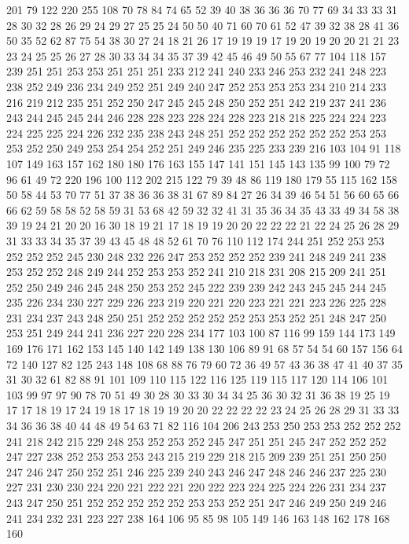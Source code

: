 201 79 122 220 255 108 70 78 84 74 65 52 39 40 38 36 36 36 70 77
69 34 33 33 31 28 30 32 28 26 29 24 29 27 25 25 24 50 50 40
71 60 70 61 52 47 39 32 38 28 41 36 50 35 52 62 87 75 54 38
30 27 24 18 21 26 17 19 19 19 17 19 20 19 20 20 21 21 23 23
24 25 25 26 27 28 30 33 34 34 35 37 39 42 45 46 49 50 55 67
77 104 118 157 239 251 251 253 253 251 251 251 233 212 241 240 233 246 253 232
241 248 223 238 252 249 236 234 249 252 251 249 240 247 252 253 253 253 234 210
214 233 216 219 212 235 251 252 250 247 245 245 248 250 252 251 242 219 237 241
236 243 244 245 245 244 246 228 228 223 228 224 228 223 218 218 225 224 224 223
224 225 225 224 226 232 235 238 243 248 251 252 252 252 252 252 252 253 253 253
252 250 249 253 254 254 252 251 249 246 235 225 233 239 216 103 104 91 118 107
149 163 157 162 180 180 176 163 155 147 141 151 145 143 135 99 100 79 72 96
61 49 72 220 196 100 112 202 215 122 79 39 48 86 119 180 179 55 115 162
158 50 58 44 53 70 77 51 37 38 36 36 38 31 67 89 84 27 26 34
39 46 54 51 56 60 65 66 66 62 59 58 58 52 58 59 31 53 68 42
59 32 32 41 31 35 36 34 35 43 33 49 34 58 38 39 19 24 21 20
20 16 30 18 19 21 17 18 19 19 20 20 22 22 22 21 22 24 25 26
28 29 31 33 33 34 35 37 39 43 45 48 48 52 61 70 76 110 112 174
244 251 252 253 253 252 252 252 245 230 248 232 226 247 253 252 252 252 239 241
248 249 241 238 253 252 252 248 249 244 252 253 253 252 241 210 218 231 208 215
209 241 251 252 250 249 246 245 248 250 253 252 245 222 239 239 242 243 245 245
244 245 235 226 234 230 227 229 226 223 219 220 221 220 223 221 221 223 226 225
228 231 234 237 243 248 250 251 252 252 252 252 252 253 253 252 251 248 247 250
253 251 249 244 241 236 227 220 228 234 177 103 100 87 116 99 159 144 173 149
169 176 171 162 153 145 140 142 149 138 130 106 89 91 68 57 54 54 60 157
156 64 72 140 127 82 125 243 148 108 68 88 76 79 60 72 36 49 57 43
36 38 47 41 40 37 35 31 30 32 61 82 88 91 101 109 110 115 122 116
125 119 115 117 120 114 106 101 103 99 97 97 90 78 70 51 49 30 28 30
33 30 34 34 25 36 30 32 31 36 38 19 25 19 17 17 18 19 17 24
19 18 17 18 19 19 20 20 22 22 22 22 23 24 25 26 28 29 31 33
33 34 36 36 38 40 44 48 49 54 63 71 82 116 104 206 243 253 250 253
253 252 252 252 241 218 242 215 229 248 253 252 253 252 245 247 251 251 245 247
252 252 252 247 227 238 252 253 253 253 243 215 219 229 218 215 209 239 251 251
250 250 247 246 247 250 252 251 246 225 239 240 243 246 247 248 246 246 237 225
230 227 231 230 230 224 220 221 222 221 220 222 223 224 225 224 226 231 234 237
243 247 250 251 252 252 252 252 252 253 253 252 251 247 246 249 250 249 246 241
234 232 231 223 227 238 164 106 95 85 98 105 149 146 163 148 162 178 168 160
